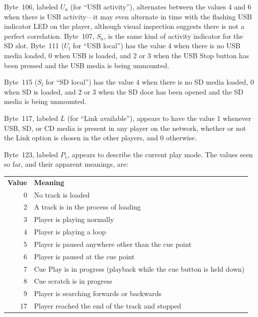 \documentclass[11pt]{article}
\begin{document}
Byte~106, labeled $U_a$ (for ``USB activity''), alternates between the
values 4 and 6 when there is USB activity---it may even alternate in
time with the flashing USB indicator LED on the player, although
visual inspection suggests there is not a perfect correlation.
Byte~107, $S_a$, is the same kind of activity indicator for the SD
slot. Byte~111 ($U_l$ for ``USB local'') has the value 4 when there is
no USB media loaded, 0 when USB is loaded, and 2 or 3 when the USB
Stop button has been pressed and the USB media is being unmounted.

Byte~115 ($S_l$ for ``SD local'') has the value 4 when there is no SD
media loaded, 0 when SD is loaded, and 2 or 3 when the SD door has
been opened and the SD media is being unmounted.

Byte~117, labeled $L$ (for ``Link available''), appears to have the
value 1 whenever USB, SD, or CD media is present in any player on the
network, whether or not the Link option is chosen in the other
players, and 0 otherwise.

\begin{samepage}
Byte~123, labeled $P_1$, appears to describe the current play mode.
The values seen so far, and their apparent meanings, are:

\begin{center}
  \begin{tabu}{rX}
    \toprule

    \bfseries{Value} & \bfseries{Meaning} \\

    0 & No track is loaded \\

    2 & A track is in the process of loading \\

    3 & Player is playing normally \\

    4 & Player is playing a loop \\

    5 & Player is paused anywhere other than the cue point \\

    6 & Player is paused at the cue point \\

    7 & Cue Play is in progress (playback while the cue button is
  held down) \\

  8 & Cue scratch is in progress \\

  9 & Player is searching forwards or backwards \\

  17 & Player reached the end of the track and stopped \\

    \bottomrule
  \end{tabu}
\end{center}
\end{samepage}
\end{document}
